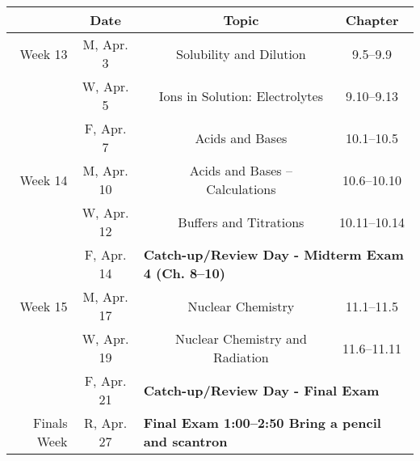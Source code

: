 \documentclass[12pt, letterpaper]{article}
\begin{document}
\noindent
\begin{tabular}{rcccc}
	            & Date       &                                                                                & Topic                                & Chapter      \\
	\midrule
	Week 13     & M, Apr. 3  &                                                                                & Solubility and Dilution              & 9.5--9.9     \\
	            & W, Apr. 5  &                                                                                & Ions in Solution: Electrolytes       & 9.10--9.13   \\
	            & F, Apr. 7  &                                                                                & Acids and Bases                      & 10.1--10.5   \\
	\midrule
	Week 14     & M, Apr. 10 &                                                                                & Acids and Bases -- Calculations      & 10.6--10.10  \\
	            & W, Apr. 12 &                                                                                & Buffers and Titrations               & 10.11--10.14 \\
	            & F, Apr. 14 & \multicolumn{3}{l}{\textbf{Catch-up/Review Day - Midterm Exam 4 (Ch. 8--10)}}                                                        \\
	\midrule
	Week 15     & M, Apr. 17 &                                                                                & Nuclear Chemistry                    & 11.1--11.5   \\
	            & W, Apr. 19 &                                                                                & Nuclear Chemistry and Radiation      & 11.6--11.11  \\
	            & F, Apr. 21 & \multicolumn{3}{l}{\textbf{Catch-up/Review Day - Final Exam}}                                                                        \\
	\midrule
	Finals Week & R, Apr. 27 & \multicolumn{3}{l}{\textbf{Final Exam 1:00--2:50 Bring a pencil and scantron}}                                                       \\
\end{tabular}
~
\end{document}
